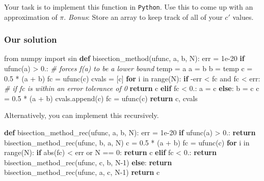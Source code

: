 \documentclass{article}
\newenvironment{Shaded}{}{}
\newcommand{\KeywordTok}[1]{\textcolor[rgb]{0.00,0.44,0.13}{\textbf{{#1}}}}
\newcommand{\DataTypeTok}[1]{\textcolor[rgb]{0.56,0.13,0.00}{{#1}}}
\newcommand{\DecValTok}[1]{\textcolor[rgb]{0.25,0.63,0.44}{{#1}}}
\newcommand{\FloatTok}[1]{\textcolor[rgb]{0.25,0.63,0.44}{{#1}}}
\newcommand{\CharTok}[1]{\textcolor[rgb]{0.25,0.44,0.63}{{#1}}}
\newcommand{\CommentTok}[1]{\textcolor[rgb]{0.38,0.63,0.69}{\textit{{#1}}}}
\newcommand{\NormalTok}[1]{{#1}}
\begin{document}
Your task is to implement this function in \texttt{Python}. Use this to
come up with an approximation of $\pi$. \emph{Bonus}: Store an array to
keep track of all of your $c'$ values.

\subsubsection{Our solution}\label{our-solution}

\begin{Shaded}
\begin{Highlighting}[]
\CharTok{from} \NormalTok{numpy }\CharTok{import} \NormalTok{sin}
\KeywordTok{def} \NormalTok{bisection_method(ufunc, a, b, N):}
    \NormalTok{err = }\FloatTok{1e-20}
    \KeywordTok{if} \NormalTok{ufunc(a) > }\DecValTok{0}\NormalTok{.: }\CommentTok{# forces f(a) to be a lower bound}
        \NormalTok{temp = a}
        \NormalTok{a = b}
        \NormalTok{b = temp}
    \NormalTok{c = }\FloatTok{0.5} \NormalTok{* (a + b)}
    \NormalTok{fc = ufunc(c)}
    \NormalTok{cvals = [c]}
    \KeywordTok{for} \NormalTok{i in }\DataTypeTok{range}\NormalTok{(N):}
        \KeywordTok{if} \NormalTok{-err < fc and fc < err: }\CommentTok{# if fc is within an error tolerance of 0}
            \KeywordTok{return} \NormalTok{c}
        \KeywordTok{elif} \NormalTok{fc < }\DecValTok{0}\NormalTok{.:}
            \NormalTok{a = c}
        \KeywordTok{else}\NormalTok{:}
            \NormalTok{b = c}
        \NormalTok{c = }\FloatTok{0.5} \NormalTok{* (a + b)}
        \NormalTok{cvals.append(c)}
        \NormalTok{fc = ufunc(c)}
    \KeywordTok{return} \NormalTok{c, cvals}
\end{Highlighting}
\end{Shaded}

Alternatively, you can implement this recursively.

\begin{Shaded}
\begin{Highlighting}[]
\KeywordTok{def} \NormalTok{bisection_method_rec(ufunc, a, b, N):}
    \NormalTok{err = }\FloatTok{1e-20}
    \KeywordTok{if} \NormalTok{ufunc(a) > }\DecValTok{0}\NormalTok{.:}
        \KeywordTok{return} \NormalTok{bisection_method_rec(ufunc, b, a, N)}
    \NormalTok{c = }\FloatTok{0.5} \NormalTok{* (a + b)}
    \NormalTok{fc = ufunc(c)}
    \KeywordTok{for} \NormalTok{i in }\DataTypeTok{range}\NormalTok{(N):}
        \KeywordTok{if} \DataTypeTok{abs}\NormalTok{(fc) < err or N == }\DecValTok{0}\NormalTok{:}
            \KeywordTok{return} \NormalTok{c}
        \KeywordTok{elif} \NormalTok{fc < }\DecValTok{0}\NormalTok{.:}
            \KeywordTok{return} \NormalTok{bisection_method_rec(ufunc, c, b, N}\DecValTok{-1}\NormalTok{)}
        \KeywordTok{else}\NormalTok{:}
            \KeywordTok{return} \NormalTok{bisection_method_rec(ufunc, a, c, N}\DecValTok{-1}\NormalTok{)}
    \KeywordTok{return} \NormalTok{c}
\end{Highlighting}
\end{Shaded}
\end{document}
